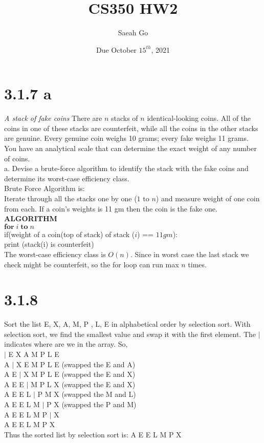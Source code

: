 \documentclass[8pt, letterpaper]{article}
\title{CS350 HW2}
\author{Saeah Go}
\date{Due October $15^{th}$, 2021}
\begin{document}
\maketitle

\section{3.1.7 a}
\indent \textit{A stack of fake coins} \indent There are $n$ stacks of $n$ identical-looking coins. All of the coins in one of these stacks are counterfeit, while all the coins in the other stacks are genuine. Every genuine coin weighs 10 grams; every fake weighs 11 grams. You have an analytical scale that can determine the exact weight of any number of coins.\\
\indent \indent a. Devise a brute-force algorithm to identify the stack with the fake coins and
determine its worst-case efficiency class. \\
\indent \indent Brute Force Algorithm is: \\
Iterate through all the stacks one by one ($1$ to $n$) and measure weight of one coin from each. If a coin's weights is 11 gm then the coin is the fake one.\\
\textbf{ALGORITHM} \\
\indent $\textbf{for}\; i \; \textbf{to} \; n$ \\
\indent \indent if(weight of a coin(top of stack) of stack ($i$) == $11 gm$): \\
\indent \indent \indent print (stack(i) is counterfeit) \\
The worst-case efficiency class is $O(n)$. Since in worst case the last stack we check might be counterfeit, so the for loop can run max $n$ times.

\section{3.1.8}
Sort the list E, X, A, M, P , L, E in alphabetical order by selection sort.
With selection sort, we find the smallest value and swap it with the first element. The $|$ indicates where are we in the array. So, \\
$|$ E X A M P L E \\
A $|$ X E M P L E (swapped the E and A) \\ 
A E $|$ X M P L E (swapped the E and X) \\
A E E $|$ M P L X (swapped the E and X) \\
A E E L $|$ P M X (swapped the M and L) \\
A E E L M $|$ P X (swapped the P and M) \\
A E E L M P $|$ X \\
A E E L M P X \\
Thus the sorted list by selection sort is: A E E L M P X
\end{document}
